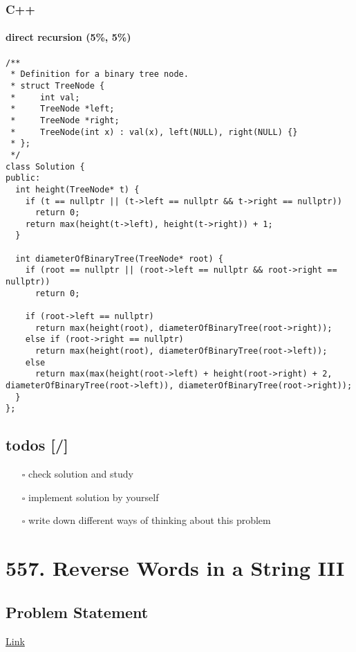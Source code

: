 \documentclass[12pt]{article}
\begin{document}
\subsubsection{C++}
\label{sec:org531cdde}
\paragraph{direct recursion (5\%, 5\%)}
\label{sec:org25e5627}
\begin{verbatim}
/**
 * Definition for a binary tree node.
 * struct TreeNode {
 *     int val;
 *     TreeNode *left;
 *     TreeNode *right;
 *     TreeNode(int x) : val(x), left(NULL), right(NULL) {}
 * };
 */
class Solution {
public:
  int height(TreeNode* t) {
    if (t == nullptr || (t->left == nullptr && t->right == nullptr))
      return 0; 
    return max(height(t->left), height(t->right)) + 1;
  }

  int diameterOfBinaryTree(TreeNode* root) {
    if (root == nullptr || (root->left == nullptr && root->right == nullptr))
      return 0;

    if (root->left == nullptr)
      return max(height(root), diameterOfBinaryTree(root->right));
    else if (root->right == nullptr)
      return max(height(root), diameterOfBinaryTree(root->left));
    else
      return max(max(height(root->left) + height(root->right) + 2, diameterOfBinaryTree(root->left)), diameterOfBinaryTree(root->right));
  }
};

\end{verbatim}

\subsection{todos [/]}
\label{sec:orgb2d5ab8}
\begin{itemize}
\item[{$\square$}] check solution and study
\item[{$\square$}] implement solution by yourself
\item[{$\square$}] write down different ways of thinking about this problem
\end{itemize}
\section{557. Reverse Words in a String III}
\label{sec:org617d484}
\subsection{Problem Statement}
\label{sec:orgb82f1bf}
\href{https://leetcode.com/problems/reverse-words-in-a-string-iii/}{Link}
\end{document}

